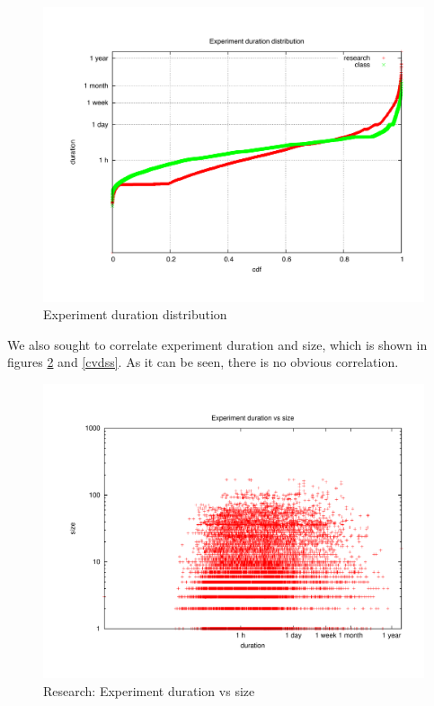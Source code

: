 \documentclass[10pt]{article}
\begin{document}
\begin{figure}[htbp]
\begin{center}
\includegraphics[width=5in]{figs/exdur.pdf}
\caption{Experiment duration distribution}
\label{exdur}
\end{center}
\end{figure}

We also sought to correlate experiment duration and size, which is shown in figures  \ref{dvss} and \ref{cvdss}. As it can be seen, there is no obvious correlation.


\begin{figure}[htbp]
\begin{center}
\includegraphics[width=5in]{figs/dvss.pdf}
\caption{Research: Experiment duration vs size}
\label{dvss}
\end{center}
\end{figure}
\end{document}
